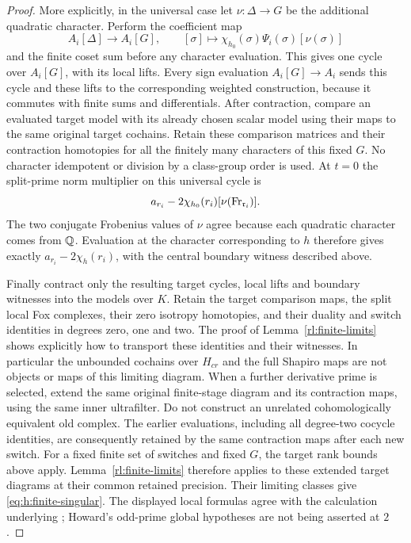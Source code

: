 \begin{proof}
More explicitly, in the universal case let
$\nu:\Delta\to G$ be the additional quadratic character.
Perform the coefficient map
\[
 A_i[\Delta]\longrightarrow A_i[G],\qquad
 [\sigma]\longmapsto
 \chi_{h_0}(\sigma)\Psi_i(\sigma)[\nu(\sigma)]
\]
and the finite coset sum before any character evaluation. This gives
one cycle over $A_i[G]$, with its local lifts. Every sign evaluation
$A_i[G]\to A_i$ sends this cycle and these lifts to the corresponding
weighted construction, because it commutes with finite sums and
differentials. After contraction, compare an evaluated target model
with its already chosen scalar model using their maps to the same
original target cochains. Retain these comparison matrices and their
contraction homotopies for all the finitely many characters of this
fixed $G$. No character idempotent or division by a class-group
order is used. At $t=0$ the split-prime norm multiplier on this universal
cycle is
\[
 a_{r_i}-2\chi_{h_0}(r_i)[\nu(\operatorname{Fr}_{\mathfrak r_i})].
\]
The two conjugate Frobenius values of $\nu$ agree because each
quadratic character comes from $\mathbb Q$. Evaluation at the character
corresponding to $h$ therefore gives exactly
$a_{r_i}-2\chi_h(r_i)$, with the central boundary witness described
above.

Finally contract only the resulting target cycles, local lifts and
boundary witnesses into the models over $K$. Retain the target
comparison maps, the split local Fox complexes, their zero isotropy
homotopies, and their duality and switch identities in degrees zero,
one and two. The proof of Lemma~\ref{rl:finite-limits} shows explicitly
how to transport these identities and their witnesses. In particular
the unbounded cochains over $H_{cr}$ and the full Shapiro maps are not
objects or maps of this limiting diagram.
When a further derivative prime is selected, extend the
same original finite-stage diagram and its contraction
maps, using the same inner ultrafilter.  Do not construct
an unrelated cohomologically equivalent old complex.
The earlier evaluations, including all degree-two
cocycle identities, are consequently retained by the
same contraction maps after each new switch. For a fixed finite set of
switches and fixed $G$, the target rank bounds above apply.
Lemma~\ref{rl:finite-limits} therefore applies to these extended
target diagrams at their common retained precision.
Their limiting classes give
\eqref{eq:h:finite-singular}.  The displayed local formulas agree with the
calculation underlying \cite[Proposition~1.7.4]{Howard2012}; Howard's
odd-prime global hypotheses are not being asserted at \(2\).
\end{proof}

